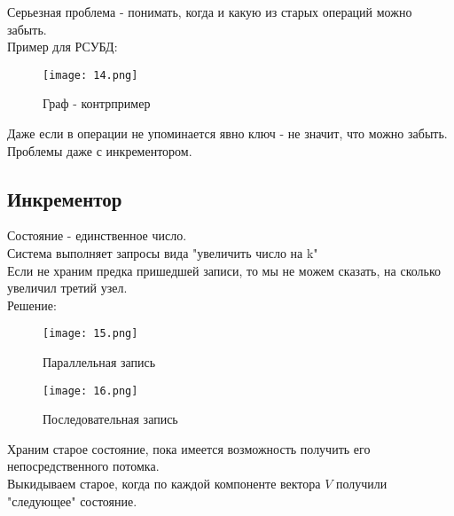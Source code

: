     Серьезная проблема - понимать, когда и какую из старых операций можно забыть.\\
    Пример для РСУБД:\\
    \begin{figure}[h]
        \centering
        \texttt{[image: 14.png]}
        \caption{Граф - контрпример}
    \end{figure}
    Даже если в операции не упоминается явно ключ - не значит, что можно забыть.\\
    Проблемы даже с инкрементором.\\
    \subsection{Инкрементор}
      Состояние - единственное число.\\
      Система выполняет запросы вида "увеличить число на k"\\
      Если не храним предка пришедшей записи, то мы не можем сказать, на сколько увеличил третий узел.\\
      Решение:\\
      \begin{figure}[h]
          \centering
          \texttt{[image: 15.png]}
          \caption{Параллельная запись}
      \end{figure}
      \begin{figure}[h]
          \centering
          \texttt{[image: 16.png]}
          \caption{Последовательная запись}
      \end{figure}
      Храним старое состояние, пока имеется возможность получить его непосредственного потомка.\\
      Выкидываем старое, когда по каждой компоненте вектора $V$ получили "следующее" состояние.
